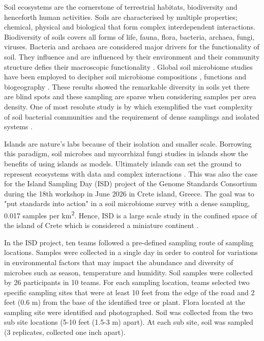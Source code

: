 Soil ecosystems are the cornerstone of terrestrial habitats, biodiversity and henceforth human activities.
Soils are characterised by multiple properties; chemical, physical and biological that 
form complex interdependent interactions. Biodiversity of soils covers
all forms of life, fauna, flora, bacteria, archaea, fungi, viruses. 
Bacteria and archaea are considered major drivers for the functionality of soil.
They influence and are influenced by their environment and their community structure 
defies their macroscopic functionality \parencite{Bahram2018}.
Global soil microbiome studies have been employed to decipher soil microbiome
compositions \parencite{thompson2017a-communal, Delgado-Baquerizo-atlas, Labouyrie2023},
functions \parencite{Bahram2018} and biogeography \parencite{Martiny2006, guerra2020Blind}.
These results showed the remarkable diversity in soils yet there are blind spots \parencite{guerra2020Blind}
and these sampling are sparse when considering samples per area density. One of most resolute
study is by \parencite{Karimi2020} which exemplified the 
vast complexity of soil bacterial communities and the requirement of
dense samplings and isolated systems \parencite{Dini-Andreote2021}.

Islands are nature's labs \parencite{Whittaker2017} because of their isolation and smaller scale.
Borrowing this paradigm, soil microbes \parencite{Li2020} and mycorrhizal fungi \parencite{Delavaux2021} studies
in islands show the benefits of using islands as models. Ultimately islands can
set the ground to represent ecosystems with data and complex interactions \parencite{Davies2016}.
This was also the case for the Island Sampling Day (ISD) project \parencite{holm2024}
of the Genome Standards Consortium \parencite{Field2011}
during the 18th workshop in June 2026 in Crete island, Greece. The goal was to "put standards into action"
in a soil microbiome survey with a dense sampling, 0.017 samples per km\textsuperscript{2}.
Hence, ISD is a large scale study in the confined space of the island of Crete which 
is considered a miniature continent \parencite{Vogiatzakis2008_crete}.

In the ISD project, ten teams followed a pre-defined sampling route of sampling locations. Samples
were collected in a single day in order to control for variations in environmental
factors that may impact the abundance and diversity of microbes such as season,
temperature and humidity. Soil samples were collected by 26 participants in 10 teams.
For each sampling location, teams selected two specific sampling sites that were
at least 10 feet from the edge of the road and 2 feet (0.6 m) from the base of
the identified tree or plant. Flora located at the sampling site were
identified and photographed. Soil was collected from the two sub site locations (5-10 feet (1.5-3 m) apart).
At each sub site, soil was sampled (3 replicates, collected one inch apart). 

